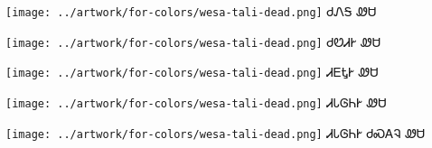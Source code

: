 \documentclass[avery5371]{flashcards}%
\begin{document}
\begin{flashcard}{
\texttt{[image: ../artwork/for-colors/wesa-tali-dead.png]}
}
\Huge ᏧᏁᎦ ᏪᏌ
\end{flashcard}
\begin{flashcard}{
\texttt{[image: ../artwork/for-colors/wesa-tali-dead.png]}
}
\Huge ᏧᏬᏗᎨ ᏪᏌ
\end{flashcard}
\begin{flashcard}{
\texttt{[image: ../artwork/for-colors/wesa-tali-dead.png]}
}
\Huge ᏗᎬᎿᎨ ᏪᏌ
\end{flashcard}
\begin{flashcard}{
\texttt{[image: ../artwork/for-colors/wesa-tali-dead.png]}
}
\Huge ᏗᏓᎶᏂᎨ ᏪᏌ
\end{flashcard}
\begin{flashcard}{
\texttt{[image: ../artwork/for-colors/wesa-tali-dead.png]}
}
\Huge ᏗᏓᎶᏂᎨ ᏧᏍᎪᎸ ᏪᏌ
\end{flashcard}
\end{document}
